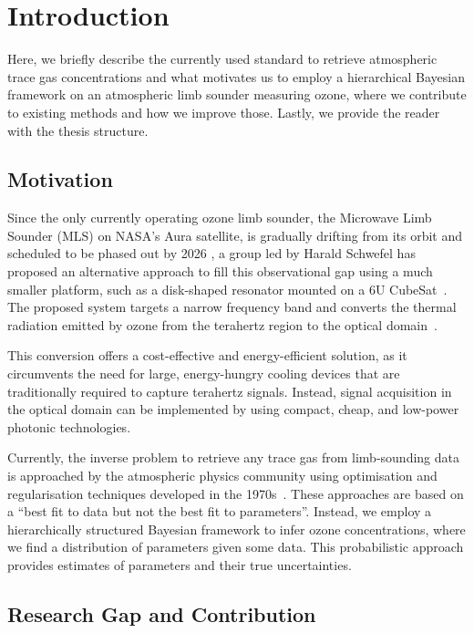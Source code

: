 \chapter{Introduction}
Here, we briefly describe the currently used standard to retrieve atmospheric trace gas concentrations and what motivates us to employ a hierarchical Bayesian framework on an atmospheric limb sounder measuring ozone, where we contribute to existing methods and how we improve those.
Lastly, we provide the reader with the thesis structure.

\section{Motivation}
Since the only currently operating ozone limb sounder, the Microwave Limb Sounder (MLS) on NASA's Aura satellite, is gradually drifting from its orbit and scheduled to be phased out by 2026 \cite{Bryan2024NASA}, a group led by Harald Schwefel has proposed an alternative approach to fill this observational gap using a much smaller platform, such as a disk-shaped resonator mounted on a 6U CubeSat~\cite{ustin2024current}. The proposed system targets a narrow frequency band and converts the thermal radiation emitted by ozone from the terahertz region to the optical domain~\cite{Suresh25,Sedlmeir14}. 

This conversion offers a cost-effective and energy-efficient solution, as it circumvents the need for large, energy-hungry cooling devices that are traditionally required to capture terahertz signals. Instead, signal acquisition in the optical domain can be implemented by using compact, cheap, and low-power photonic technologies.

Currently, the inverse problem to retrieve any trace gas from limb-sounding data is approached by the atmospheric physics community using optimisation and regularisation techniques developed in the 1970s~\cite{rodgers1976retrieval, NASA2022MLSv5}.
These approaches are based on a ``best fit to data but not the best fit to parameters''\cite{tan2016LecNot}.
Instead, we employ a hierarchically structured Bayesian framework to infer ozone concentrations, where we find a distribution of parameters given some data.
This probabilistic approach provides estimates of parameters and their true uncertainties.

\section{Research Gap and Contribution}

